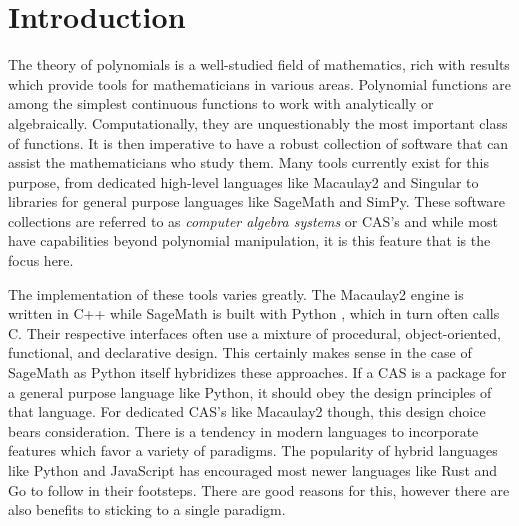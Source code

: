 \documentclass[MS, xcolor=dvipsnames]{wfuthesis}
\theoremstyle{definition}
\begin{document}
\chapters


\chapter{Introduction}
The theory of polynomials is a well-studied field of mathematics, rich with results which provide tools for mathematicians in various areas. Polynomial functions are among the simplest continuous functions to work with analytically or algebraically. Computationally, they are unquestionably the most important class of functions. It is then imperative to have a robust collection of software that can assist the mathematicians who study them. Many tools currently exist for this purpose, from dedicated high-level languages like Macaulay2 and Singular to libraries for general purpose languages like SageMath and SimPy. These software collections are referred to as \textit{computer algebra systems} or CAS's and while most have capabilities beyond polynomial manipulation, it is this feature that is the focus here. \par
The implementation of these tools varies greatly. The Macaulay2 engine is written in C++ \cite{M2} while SageMath is built with Python \cite{SageMath}, which in turn often calls C. Their respective interfaces often use a mixture of procedural, object-oriented, functional, and declarative design. This certainly makes sense in the case of SageMath as Python itself hybridizes these approaches. If a CAS is a package for a general purpose language like Python, it should obey the design principles of that language. For dedicated CAS's like Macaulay2 though, this design choice bears consideration. There is a tendency in modern languages to incorporate features which favor a variety of paradigms. The popularity of hybrid languages like Python and JavaScript has encouraged most newer languages like Rust and Go to follow in their footsteps. There are good reasons for this, however there are also benefits to sticking to a single paradigm. \par
\end{document}
